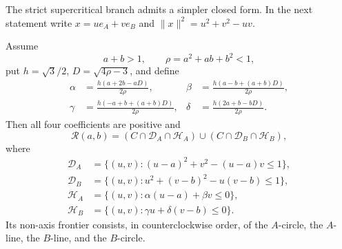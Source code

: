 The strict supercritical branch admits a simpler closed form.  In the next
statement write $x=ue_A+ve_B$ and
$\lVert x\rVert^2=u^2+v^2-uv$.

\begin{theorem}
\label{thm:strict-ab-union}
Assume
\[
 a+b>1,\qquad \rho=a^2+ab+b^2<1,
\]
put $h=\sqrt3/2$, $D=\sqrt{4\rho-3}$, and define
\begin{align*}
 \alpha&=\frac{h(a+2b-aD)}{2\rho},&
 \beta&=\frac{h(a-b+(a+b)D)}{2\rho},\\
 \gamma&=\frac{h(-a+b+(a+b)D)}{2\rho},&
 \delta&=\frac{h(2a+b-bD)}{2\rho}.
\end{align*}
Then all four coefficients are positive and
\begin{equation}
 \mathcal R(a,b)=
 (C\cap\mathcal D_A\cap\mathcal H_A)
 \cup(C\cap\mathcal D_B\cap\mathcal H_B),       \label{eq:strict-ab-identity}
\end{equation}
where
\begin{align*}
 \mathcal D_A&=\{(u,v):(u-a)^2+v^2-(u-a)v\le1\},\\
 \mathcal D_B&=\{(u,v):u^2+(v-b)^2-u(v-b)\le1\},\\
 \mathcal H_A&=\{(u,v):\alpha(u-a)+\beta v\le0\},\\
 \mathcal H_B&=\{(u,v):\gamma u+\delta(v-b)\le0\}.
\end{align*}
Its non-axis frontier consists, in counterclockwise order, of the
$A$-circle, the $A$-line, the $B$-line, and the $B$-circle.
\end{theorem}



